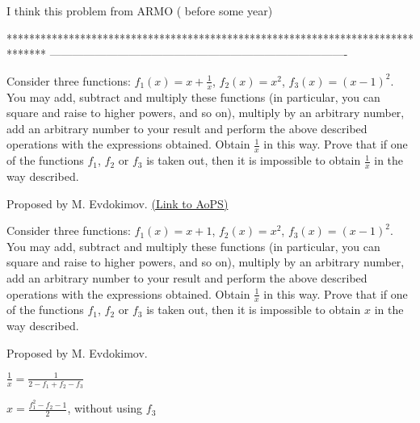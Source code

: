 \begin{solution}
	I think this problem from ARMO ( before some year)
\end{solution}
*******************************************************************************
-------------------------------------------------------------------------------

\begin{problem}
	Consider three functions: $f_1(x)=x+\frac{1}{x}$, $f_2(x)=x^2$, $f_3(x)=(x-1)^2$. You may add, subtract and multiply these functions (in particular, you can square and raise to higher powers, and so on), multiply by an arbitrary number, add an arbitrary number to your result and perform the above described operations with the expressions obtained. Obtain $\frac{1}{x}$ in this way. Prove that if one of the functions $f_1$, $f_2$ or $f_3$ is taken out, then it is impossible to obtain $\frac{1}{x}$ in the way described. 

Proposed by M. Evdokimov.
	\flushright \href{https://artofproblemsolving.com/community/c6h589697}{(Link to AoPS)}
\end{problem}



\begin{solution}
	\begin{tcolorbox}Consider three functions: $f_1(x)=x+1$, $f_2(x)=x^2$, $f_3(x)=(x-1)^2$. You may add, subtract and multiply these functions (in particular, you can square and raise to higher powers, and so on), multiply by an arbitrary number, add an arbitrary number to your result and perform the above described operations with the expressions obtained. Obtain $\frac{1}{x}$ in this way. Prove that if one of the functions $f_1$, $f_2$ or $f_3$ is taken out, then it is impossible to obtain $x$ in the way described. 

Proposed by M. Evdokimov.\end{tcolorbox}
$\frac 1x=\frac 1{2-f_1+f_2-f_3}$

$x=\frac{f_1^2-f_2-1}2$, without using $f_3$
\end{solution}



